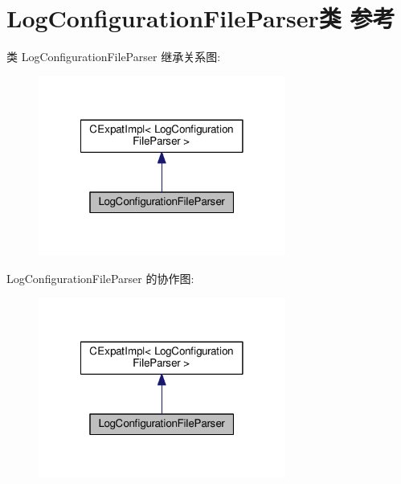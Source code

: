 \hypertarget{class_log_configuration_file_parser}{\section{Log\+Configuration\+File\+Parser类 参考}
\label{class_log_configuration_file_parser}
}


类 Log\+Configuration\+File\+Parser 继承关系图\+:
\nopagebreak
\begin{figure}[H]
\begin{center}
\leavevmode
\includegraphics[width=230pt]{class_log_configuration_file_parser__inherit__graph}
\end{center}
\end{figure}


Log\+Configuration\+File\+Parser 的协作图\+:
\nopagebreak
\begin{figure}[H]
\begin{center}
\leavevmode
\includegraphics[width=230pt]{class_log_configuration_file_parser__coll__graph}
\end{center}
\end{figure}
